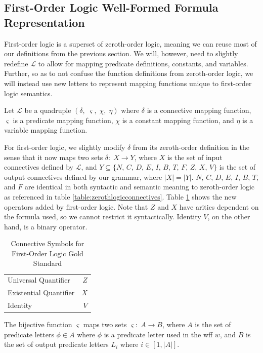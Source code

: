 \documentclass[ms]{uncgdissertationexp2}
\theoremstyle{plain}
\theoremstyle{definition}
\theoremstyle{remark}
\begin{document}
\subsection{First-Order Logic Well-Formed Formula Representation}

First-order logic is a superset of zeroth-order logic, meaning we can reuse most of our definitions from the previous section. We will, however, need to slightly redefine $\mathcal{L}$ to allow for mapping predicate definitions, constants, and variables. Further, so as to not confuse the function definitions from zeroth-order logic, we will instead use new letters to represent mapping functions unique to first-order logic semantics.

Let $\mathcal{L}$ be a quadruple $(\delta,\;\varsigma,\;\chi,\;\eta)$ where $\delta$ is a connective mapping function, $\varsigma$ is a predicate mapping function, $\chi$ is a constant mapping function, and $\eta$ is a variable mapping function. 

For first-order logic, we slightly modify $\delta$ from its zeroth-order definition in the sense that it now maps two sets $\delta:\;X \to Y$, where $X$ is the set of input connectives defined by $\mathcal{L}$, and $Y \subseteq \{N,\,C,\,D,\,E,\,I,\,B,\,T,\,F,\,Z,\,X,\,V\}$ is the set of output connectives defined by our grammar, where $|X| = |Y|$. $N$, $C$, $D$, $E$, $I$, $B$, $T$, and $F$ are identical in both syntactic and semantic meaning to zeroth-order logic as referenced in table \ref{table:zerothlogicconnectives}. Table \ref{table:firstlogicconnectives} shows the new operators added by first-order logic. Note that $Z$ and $X$ have arities dependent on the formula used, so we cannot restrict it syntactically. Identity $V$, on the other hand, is a binary operator.
\begin{table}[!ht]
	\caption{Connective Symbols for First-Order Logic Gold Standard}
	\label{table:firstlogicconnectives}
	\centering
	\begin{tabular}{lr}
	  \toprule
	  \thead{Semantic Meaning}&\thead{Connective Symbol}\\
	  \midrule
	  Universal Quantifier&$Z$\\
	  Existential Quantifier&$X$\\
	  Identity&$V$\\
	\bottomrule
  \end{tabular}
\end{table}

The bijective function $\varsigma$ maps two sets $\varsigma:\;A \to B$, where $A$ is the set of predicate letters $\phi \in A$ where $\phi$ is a predicate letter used in the wff $w$, and $B$ is the set of output predicate letters $L_{i}$ where $i \in [1, |A|]$.
\end{document}
